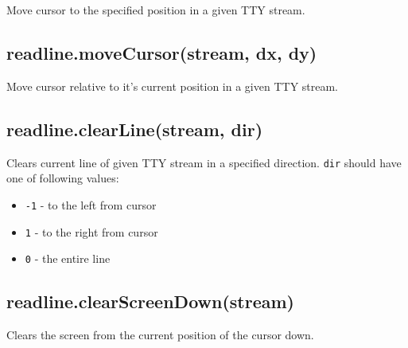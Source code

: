 Move cursor to the specified position in a given TTY stream.

\subsection{readline.moveCursor(stream, dx,
dy)}\label{readline.movecursorstream-dx-dy}

Move cursor relative to it's current position in a given TTY stream.

\subsection{readline.clearLine(stream,
dir)}\label{readline.clearlinestream-dir}

Clears current line of given TTY stream in a specified direction.
\texttt{dir} should have one of following values:

\begin{itemize}
\itemsep1pt\parskip0pt
\item
  \texttt{-1} - to the left from cursor
\item
  \texttt{1} - to the right from cursor
\item
  \texttt{0} - the entire line
\end{itemize}

\subsection{readline.clearScreenDown(stream)}\label{readline.clearscreendownstream}

Clears the screen from the current position of the cursor down.
